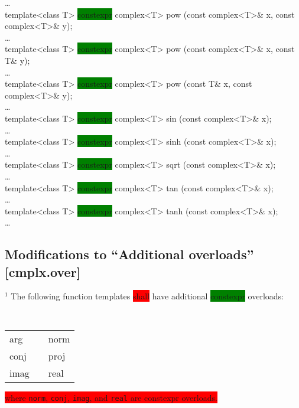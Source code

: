 \documentclass[prd,twocolumn,amsmath,amssymb,nofootinbib,eqsecnum]{revtex4-1}
\newcommand{\code}[1]{{\tt #1}}
\newcommand{\highlight}[1]{\colorbox{green}{\!\!\!\! #1}}
\newcommand{\remove}[1]{\colorbox{red}{\!\!\!\! #1}}
\begin{document}
{	\ldots\\
 
 	template<class T> \highlight{constexpr} complex<T> pow  (const complex<T>\& x, const complex<T>\& y);\\	
	\ldots\\

  	template<class T> \highlight{constexpr} complex<T> pow  (const complex<T>\& x, const T\& y);\\
	
	\ldots\\

	template<class T> \highlight{constexpr} complex<T> pow  (const T\& x, const complex<T>\& y);\\

	\ldots\\

  	template<class T> \highlight{constexpr} complex<T> sin  (const complex<T>\& x);\\

	\ldots\\
	
	template<class T> \highlight{constexpr} complex<T> sinh (const complex<T>\& x);\\

	\ldots\\
 
 	template<class T> \highlight{constexpr} complex<T> sqrt (const complex<T>\& x);\\

	\ldots\\
 
 	template<class T> \highlight{constexpr} complex<T> tan  (const complex<T>\& x);\\

	\ldots\\

	template<class T> \highlight{constexpr} complex<T> tanh (const complex<T>\& x);\\

	\ldots\\
}

\subsection{Modifications to  ``Additional overloads'' [cmplx.over]}

$^1$ The following function templates \remove{shall} have additional \highlight{constexpr} overloads:
\newline
\hspace{5em}
\code{
\begin{tabular}{lll}
	arg &\qquad \qquad\qquad&norm
\\
	conj & \qquad\qquad\qquad&proj
\\ 
	imag & \qquad \qquad\qquad&real
\end{tabular}
}
\newline
\remove{where \code{norm}, \code{conj}, \code{imag}, and \code{real} are constexpr overloads.}
\end{document}
